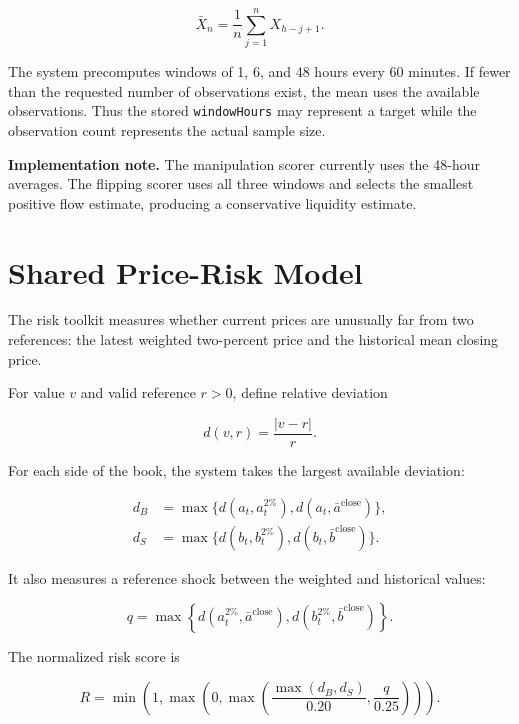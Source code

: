 \documentclass[11pt,a4paper]{article}
\newcommand{\code}[1]{\texttt{#1}}
\newcommand{\clip}[1]{\min\!\left(1,\max(0,#1)\right)}
\newcommand{\implementation}[1]{%
  \vspace{0.2em}\noindent
  \colorbox{light}{\parbox{0.95\linewidth}{\textbf{Implementation note.} #1}}
  \vspace{0.2em}}
\begin{document}
\begin{equation}
\bar X_n=\frac{1}{n}\sum_{j=1}^{n}X_{h-j+1}.
\end{equation}

The system precomputes windows of 1, 6, and 48 hours every 60 minutes. If fewer than the
requested number of observations exist, the mean uses the available observations. Thus the
stored \code{windowHours} may represent a target while the observation count represents the
actual sample size.

\implementation{The manipulation scorer currently uses the 48-hour averages. The flipping
scorer uses all three windows and selects the smallest positive flow estimate, producing a
conservative liquidity estimate.}

\section{Shared Price-Risk Model}

The risk toolkit measures whether current prices are unusually far from two references:
the latest weighted two-percent price and the historical mean closing price.

For value $v$ and valid reference $r>0$, define relative deviation

\begin{equation}
d(v,r)=\frac{|v-r|}{r}.
\end{equation}

For each side of the book, the system takes the largest available deviation:

\begin{align}
d_B &= \max\{d(a_t,a_t^{2\%}),d(a_t,\bar a^{\mathrm{close}})\},\\
d_S &= \max\{d(b_t,b_t^{2\%}),d(b_t,\bar b^{\mathrm{close}})\}.
\end{align}

It also measures a reference shock between the weighted and historical values:

\begin{equation}
q=\max\left\{d(a_t^{2\%},\bar a^{\mathrm{close}}),
d(b_t^{2\%},\bar b^{\mathrm{close}})\right\}.
\end{equation}

The normalized risk score is

\begin{equation}
R=\clip{\max\left(\frac{\max(d_B,d_S)}{0.20},\frac{q}{0.25}\right)}.
\end{equation}
\end{document}
